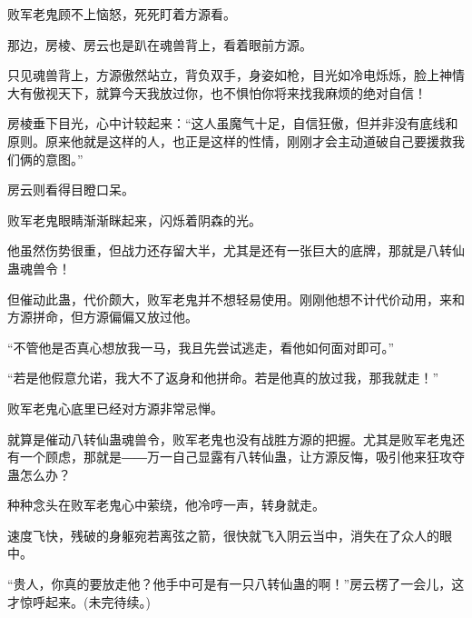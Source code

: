 \begin{this_body}
败军老鬼顾不上恼怒，死死盯着方源看。

那边，房棱、房云也是趴在魂兽背上，看着眼前方源。

只见魂兽背上，方源傲然站立，背负双手，身姿如枪，目光如冷电烁烁，脸上神情大有傲视天下，就算今天我放过你，也不惧怕你将来找我麻烦的绝对自信！

房棱垂下目光，心中计较起来：“这人虽魔气十足，自信狂傲，但并非没有底线和原则。原来他就是这样的人，也正是这样的性情，刚刚才会主动道破自己要援救我们俩的意图。”

房云则看得目瞪口呆。

败军老鬼眼睛渐渐眯起来，闪烁着阴森的光。

他虽然伤势很重，但战力还存留大半，尤其是还有一张巨大的底牌，那就是八转仙蛊魂兽令！

但催动此蛊，代价颇大，败军老鬼并不想轻易使用。刚刚他想不计代价动用，来和方源拼命，但方源偏偏又放过他。

“不管他是否真心想放我一马，我且先尝试逃走，看他如何面对即可。”

“若是他假意允诺，我大不了返身和他拼命。若是他真的放过我，那我就走！”

败军老鬼心底里已经对方源非常忌惮。

就算是催动八转仙蛊魂兽令，败军老鬼也没有战胜方源的把握。尤其是败军老鬼还有一个顾虑，那就是――万一自己显露有八转仙蛊，让方源反悔，吸引他来狂攻夺蛊怎么办？

种种念头在败军老鬼心中萦绕，他冷哼一声，转身就走。

速度飞快，残破的身躯宛若离弦之箭，很快就飞入阴云当中，消失在了众人的眼中。

“贵人，你真的要放走他？他手中可是有一只八转仙蛊的啊！”房云楞了一会儿，这才惊呼起来。(未完待续。)

\end{this_body}

